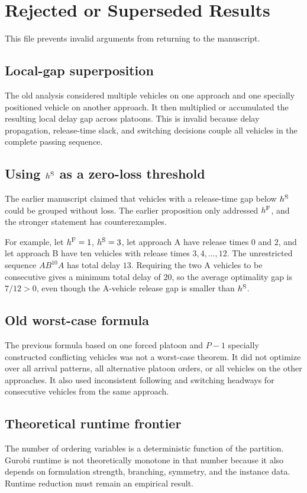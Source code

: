 \section*{Rejected or Superseded Results}

This file prevents invalid arguments from returning to the manuscript.

\subsection*{Local-gap superposition}

\statusrejected

The old analysis considered multiple vehicles on one approach and one specially positioned vehicle on another approach. It then multiplied or accumulated the resulting local delay gap across platoons. This is invalid because delay propagation, release-time slack, and switching decisions couple all vehicles in the complete passing sequence.

\subsection*{Using \(h^{\mathrm{S}}\) as a zero-loss threshold}

\statusrejected

The earlier manuscript claimed that vehicles with a release-time gap below \(h^{\mathrm{S}}\) could be grouped without loss. The earlier proposition only addressed \(h^{\mathrm{F}}\), and the stronger statement has counterexamples.

For example, let \(h^{\mathrm{F}}=1\), \(h^{\mathrm{S}}=3\), let approach A have release times \(0\) and \(2\), and let approach B have ten vehicles with release times \(3,4,\ldots,12\). The unrestricted sequence \(AB^{10}A\) has total delay \(13\). Requiring the two A vehicles to be consecutive gives a minimum total delay of \(20\), so the average optimality gap is \(7/12>0\), even though the A-vehicle release gap is smaller than \(h^{\mathrm{S}}\).

\subsection*{Old worst-case formula}

\statusrejected

The previous formula based on one forced platoon and \(P-1\) specially constructed conflicting vehicles was not a worst-case theorem. It did not optimize over all arrival patterns, all alternative platoon orders, or all vehicles on the other approaches. It also used inconsistent following and switching headways for consecutive vehicles from the same approach.

\subsection*{Theoretical runtime frontier}

\statusrejected

The number of ordering variables is a deterministic function of the partition. Gurobi runtime is not theoretically monotone in that number because it also depends on formulation strength, branching, symmetry, and the instance data. Runtime reduction must remain an empirical result.
